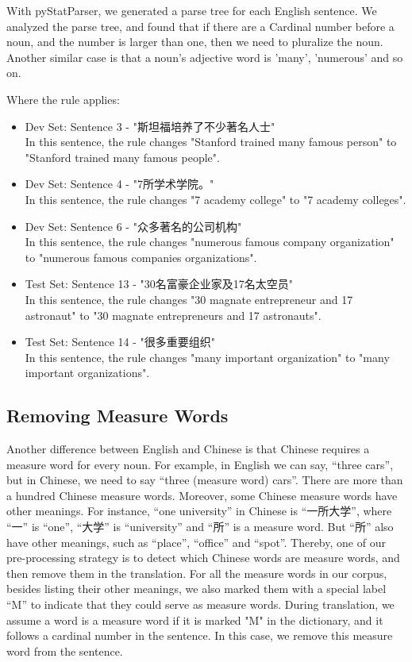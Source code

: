 \documentclass[11pt]{article} %
\begin{document}
\begin{CJK}{UTF8}{gbsn}
With pyStatParser, we generated a parse tree for each English sentence. We analyzed the parse tree, and found that if there are a Cardinal number before a noun, and the number is larger than one, then we need to pluralize the noun. Another similar case is that a noun's adjective word is 'many', 'numerous' and so on.

Where the rule applies:
\begin{itemize}
\item Dev Set: Sentence 3 - "斯坦福培养了不少著名人士"\\
In this sentence, the rule changes "Stanford trained many famous person" to "Stanford trained many famous people".
\item Dev Set: Sentence 4 - "7所学术学院。"\\
In this sentence, the rule changes "7  academy college" to "7 academy colleges".
\item Dev Set: Sentence 6 - "众多著名的公司机构"\\
In this sentence, the rule changes "numerous famous company organization" to "numerous famous companies organizations".
\item Test Set: Sentence 13 - "30名富豪企业家及17名太空员"\\
In this sentence, the rule changes "30  magnate entrepreneur and 17  astronaut" to "30 magnate entrepreneurs and 17 astronauts".
\item Test Set: Sentence 14 - "很多重要组织"\\
In this sentence, the rule changes "many important organization" to "many important organizations".
\end{itemize}

\subsection{Removing Measure Words}
Another difference between English and Chinese is that Chinese requires a measure word for every noun. For example, in English we can say, “three cars”, but in Chinese, we need to say “three (measure word) cars”. There are more than a hundred Chinese measure words. Moreover, some Chinese measure words have other meanings. For instance, “one university” in Chinese is “一所大学”, where “一” is “one”, “大学” is “university” and “所” is a measure word. But “所” also have other meanings, such as “place”, “office” and “spot”. Thereby, one of our pre-processing strategy is to detect which Chinese words are measure words, and then remove them in the translation. 
For all the measure words in our corpus, besides listing their other meanings, we also marked them with a special label “M” to indicate that they could serve as measure words. During translation, we assume a word is a measure word if it is marked "M" in the dictionary, and it follows a cardinal number in the sentence. In this case, we remove this measure word from the sentence.


\end{CJK}
\end{document}
